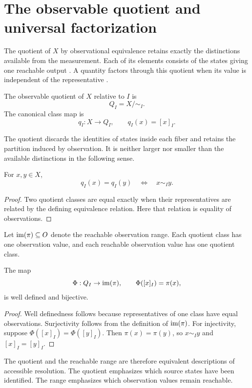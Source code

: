 \section{The observable quotient and universal factorization}
\label{sec:observablequotient}

The quotient of \(X\) by observational equivalence retains exactly the distinctions available from the measurement. Each of its elements consists of the states giving one reachable output \parencite[Chs. 8--11]{Halmos1974}. A quantity factors through this quotient when its value is independent of the representative \parencite{MacLaneBirkhoff1999,Leinster2014}.

\begin{definition}
The observable quotient of \(X\) relative to \(I\) is
\[
Q_I=X/{\sim_I}.
\]
The canonical class map is
\[
q_I:X\to Q_I,
\qquad
q_I(x)=[x]_I.
\]
\end{definition}
The quotient discards the identities of states inside each fiber and retains the partition induced by observation. It is neither larger nor smaller than the available distinctions in the following sense.

\begin{proposition}
For \(x,y\in X\),
\[
q_I(x)=q_I(y)
\quad\Longleftrightarrow\quad
x\sim_I y.
\]
\end{proposition}

\begin{proof}
Two quotient classes are equal exactly when their representatives are related by the defining equivalence relation. Here that relation is equality of observations.
\end{proof}
Let \(\operatorname{im}(\pi)\subseteq O\) denote the reachable observation range. Each quotient class has one observation value, and each reachable observation value has one quotient class.

\begin{theorem}
The map
\[
\Phi:Q_I\to\operatorname{im}(\pi),
\qquad
\Phi([x]_I)=\pi(x),
\]
is well defined and bijective.
\end{theorem}

\begin{proof}
Well definedness follows because representatives of one class have equal observations. Surjectivity follows from the definition of \(\operatorname{im}(\pi)\). For injectivity, suppose \(\Phi([x]_I)=\Phi([y]_I)\). Then \(\pi(x)=\pi(y)\), so \(x\sim_I y\) and \([x]_I=[y]_I\).
\end{proof}
The quotient and the reachable range are therefore equivalent descriptions of accessible resolution. The quotient emphasizes which source states have been identified. The range emphasizes which observation values remain reachable.

